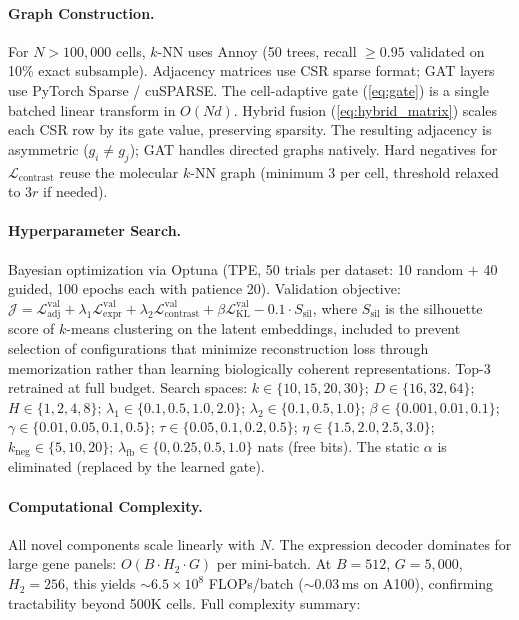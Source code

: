 \documentclass{article}
\newcommand{\KL}{\mathrm{KL}}
\begin{document}
\paragraph{Graph Construction.} For $N > 100{,}000$ cells, $k$-NN uses Annoy (50 trees, recall $\geq 0.95$ validated on 10\% exact subsample). Adjacency matrices use CSR sparse format; GAT layers use PyTorch Sparse / cuSPARSE. The cell-adaptive gate (\cref{eq:gate}) is a single batched linear transform in $O(Nd)$. Hybrid fusion (\cref{eq:hybrid_matrix}) scales each CSR row by its gate value, preserving sparsity. The resulting adjacency is asymmetric ($g_i \neq g_j$); GAT handles directed graphs natively. Hard negatives for $\mathcal{L}_{\text{contrast}}$ reuse the molecular $k$-NN graph (minimum 3 per cell, threshold relaxed to $3r$ if needed).

\paragraph{Hyperparameter Search.} Bayesian optimization via Optuna (TPE, 50 trials per dataset: 10 random $+$ 40 guided, 100 epochs each with patience 20). Validation objective: $\mathcal{J} = \mathcal{L}_{\text{adj}}^{\text{val}} + \lambda_1 \mathcal{L}_{\text{expr}}^{\text{val}} + \lambda_2 \mathcal{L}_{\text{contrast}}^{\text{val}} + \beta \mathcal{L}_{\KL}^{\text{val}} - 0.1 \cdot S_{\text{sil}}$, where $S_{\text{sil}}$ is the silhouette score of $k$-means clustering on the latent embeddings, included to prevent selection of configurations that minimize reconstruction loss through memorization rather than learning biologically coherent representations. Top-3 retrained at full budget. Search spaces: $k \in \{10,15,20,30\}$; $D \in \{16,32,64\}$; $H \in \{1,2,4,8\}$; $\lambda_1 \in \{0.1,0.5,1.0,2.0\}$; $\lambda_2 \in \{0.1,0.5,1.0\}$; $\beta \in \{0.001,0.01,0.1\}$; $\gamma \in \{0.01,0.05,0.1,0.5\}$; $\tau \in \{0.05,0.1,0.2,0.5\}$; $\eta \in \{1.5,2.0,2.5,3.0\}$; $k_{\text{neg}} \in \{5,10,20\}$; $\lambda_{\text{fb}} \in \{0, 0.25, 0.5, 1.0\}$ nats (free bits). The static $\alpha$ is eliminated (replaced by the learned gate).

\paragraph{Computational Complexity.} All novel components scale linearly with $N$. The expression decoder dominates for large gene panels: $O(B \cdot H_2 \cdot G)$ per mini-batch. At $B{=}512$, $G{=}5{,}000$, $H_2{=}256$, this yields ${\sim}6.5 \times 10^8$ FLOPs/batch (${\sim}0.03$\,ms on A100), confirming tractability beyond 500K cells. Full complexity summary:
\end{document}
